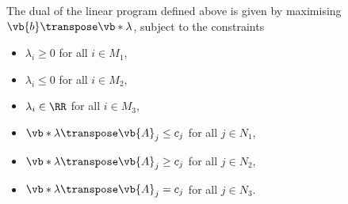 \begin{theorem}
    The dual of the linear program defined above is given by maximising \(\vb{b}\transpose \vb*{\lambda}\), subject to the constraints
    \begin{itemize}
        \item \(\lambda_i \geq 0\) for all \(i \in M_1\),
        \item \(\lambda_i \leq 0\) for all \(i \in M_2\),
        \item \(\lambda_i \in \RR\) for all \(i \in M_3\),
        \item \(\vb*{\lambda}\transpose \vb{A}_j \leq c_j\) for all \(j \in N_1\),
        \item \(\vb*{\lambda}\transpose \vb{A}_j \geq c_j\) for all \(j \in N_2\),
        \item \(\vb*{\lambda}\transpose \vb{A}_j = c_j\) for all \(j \in N_3\).
    \end{itemize}
\end{theorem}

